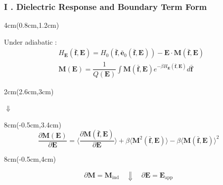 \documentclass{beamer}
\begin{document}
	\begin{frame}
		\frametitle{I . Dielectric Response and Boundary Term Form}
		\footnotesize 
		
		\begin{textblock*}{4cm}(0.8cm,1.2cm) 
			
			Under adiabatic : 
			\begin{align*}
				&H_{\mathbf{E}}( \bar{\mathbf{f}}, \mathbf{E} )  =  H_0( \bar{\mathbf{f}}, \bar{\mathbf{e}}_0(\bar{\mathbf{f}}, \mathbf{E} )  ) - \mathbf{E}\cdot \mathbf{M}(\bar{\mathbf{f}}, \mathbf{E}) \\
				&\mathbf{M}(\mathbf{E}) = \dfrac{1}{Q(\mathbf{E})} \int  	\mathbf{M}(\bar{\mathbf{f}}, \mathbf{E}  )  e^{-\beta H_{\mathbf{E}}( \bar{\mathbf{f}}, \mathbf{E} )} d \bar{\mathbf{f}} 
			\end{align*}
		\end{textblock*}
		
		\begin{textblock*}{2cm}(2.6cm,3cm)  
			\begin{center}
				$\Downarrow$ 
			\end{center}
		\end{textblock*}
		
		\begin{textblock*}{8cm}(-0.5cm,3.4cm)  
			\begin{equation*}
				\dfrac{\partial \mathbf{M}(\mathbf{E})}{\partial \mathbf{E}} = \langle\dfrac{\partial\mathbf{M}(\bar{\mathbf{f}}, \mathbf{E}  ) }{\partial \mathbf{E} } \rangle + \beta \langle \mathbf{M}^2(\bar{\mathbf{f}}, \mathbf{E}  )  \rangle 
				-\beta \langle \mathbf{M}(\bar{\mathbf{f}}, \mathbf{E}  )  \rangle^2  
			\end{equation*}
		\end{textblock*}
		
		\begin{textblock*}{8cm}(-0.5cm,4cm)  
			\begin{center}
				\begin{equation*}
					\partial \mathbf{M} = \mathbf{M}_{\text{ind}} 
					\quad \Downarrow \quad 
					\partial \mathbf{E} = \mathbf{E}_{\text{app}}
				\end{equation*}
			\end{center}
		\end{textblock*}
		

\end{frame}
\end{document}

